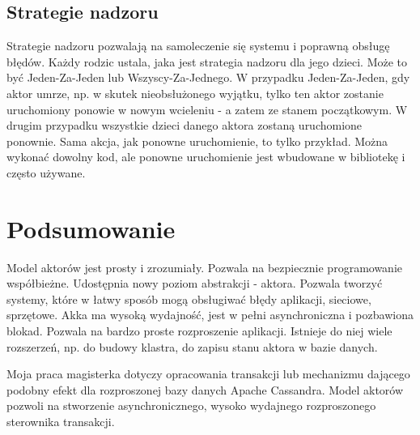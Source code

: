 \documentclass[oneside, 12pt, a4paper]{article}
\begin{document}
\begin{multicols}{2}
\subsection{Strategie nadzoru}
Strategie nadzoru pozwalają na samoleczenie się systemu i poprawną obsługę błędów. Każdy rodzic ustala, jaka jest strategia nadzoru dla jego dzieci. Może to być Jeden-Za-Jeden lub Wszyscy-Za-Jednego. W przypadku Jeden-Za-Jeden, gdy aktor umrze, np. w skutek nieobsłużonego wyjątku, tylko ten aktor zostanie uruchomiony ponowie w nowym wcieleniu - a zatem ze stanem początkowym. W drugim przypadku wszystkie dzieci danego aktora zostaną uruchomione ponownie. Sama akcja, jak ponowne uruchomienie, to tylko przykład. Można wykonać dowolny kod, ale ponowne uruchomienie jest wbudowane w bibliotekę i często używane.

\section{Podsumowanie}
Model aktorów jest prosty i zrozumiały. Pozwala na bezpiecznie programowanie współbieżne. Udostępnia nowy poziom abstrakcji - aktora. Pozwala tworzyć systemy, które w łatwy sposób mogą obsługiwać błędy aplikacji, sieciowe, sprzętowe. \mbox{Akka} ma wysoką wydajność, jest w pełni asynchroniczna i pozbawiona blokad. Pozwala na bardzo proste rozproszenie aplikacji. Istnieje do niej wiele rozszerzeń, np. do budowy klastra, do zapisu stanu aktora w bazie danych.

Moja praca magisterka dotyczy opracowania transakcji lub mechanizmu dającego podobny efekt dla rozproszonej bazy danych Apache Cassandra. Model aktorów pozwoli na stworzenie asynchronicznego, wysoko wydajnego rozproszonego sterownika transakcji.



%
%
%
%
%
%
%


\end{multicols}
\end{document}
